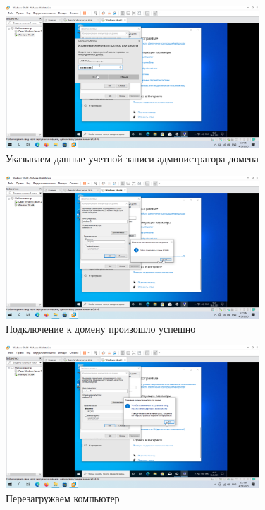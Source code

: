\documentclass[a4paper]{article}
\begin{document}
  \begin{figure}[H]
    \centering
    \includegraphics[width=0.85\textwidth]{Screenshot_106}
    \caption{Указываем данные учетной записи администратора домена}
    \label{img:106}
  \end{figure}

  \begin{figure}[H]
    \centering
    \includegraphics[width=0.85\textwidth]{Screenshot_107}
    \caption{Подключение к домену произошло успешно}
    \label{img:107}
  \end{figure}

  \begin{figure}[H]
    \centering
    \includegraphics[width=0.85\textwidth]{Screenshot_108}
    \caption{Перезагружаем компьютер}
    \label{img:108}
  \end{figure}
\end{document}
